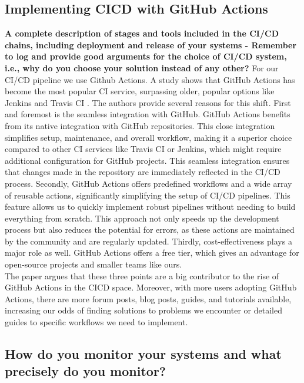 \documentclass[11pt]{article}
\begin{document}
\subsection{Implementing CI\/CD with GitHub Actions}
\textbf{A complete description of stages and tools included in the CI/CD chains, including deployment and release of your systems - Remember to log and provide good arguments for the choice of CI/CD system, i.e., why do you choose your solution instead of any other?}
For our CI/CD pipeline we use Github Actions. A study shows that GitHub Actions has become the most popular CI service, surpassing older, popular options like Jenkins and Travis CI \citep{github_actions_good}. The authors provide several reasons for this shift. First and foremost is the seamless integration with GitHub. GitHub Actions benefits from its native integration with GitHub repositories. This close integration simplifies setup, maintenance, and overall workflow, making it a superior choice compared to other CI services like Travis CI or Jenkins, which might require additional configuration for GitHub projects. This seamless integration ensures that changes made in the repository are immediately reflected in the CI/CD process. 
Secondly, GitHub Actions offers predefined workflows and a wide array of reusable actions, significantly simplifying the setup of CI/CD pipelines. This feature allows us to quickly implement robust pipelines without needing to build everything from scratch. This approach not only speeds up the development process but also reduces the potential for errors, as these actions are maintained by the community and are regularly updated.
Thirdly, cost-effectiveness plays a major role as well. GitHub Actions offers a free tier, which gives an advantage for open-source projects and smaller teams like ours. \\
The paper argues that these three points are a big contributor to the rise of GitHub Actions in the CI\/CD space. Moreover, with more users adopting GitHub Actions, there are more forum posts, blog posts, guides, and tutorials available, increasing our odds of finding solutions to problems we encounter or detailed guides to specific workflows we need to implement. 



\subsection{How do you monitor your systems and what precisely do you monitor?}
\end{document}
